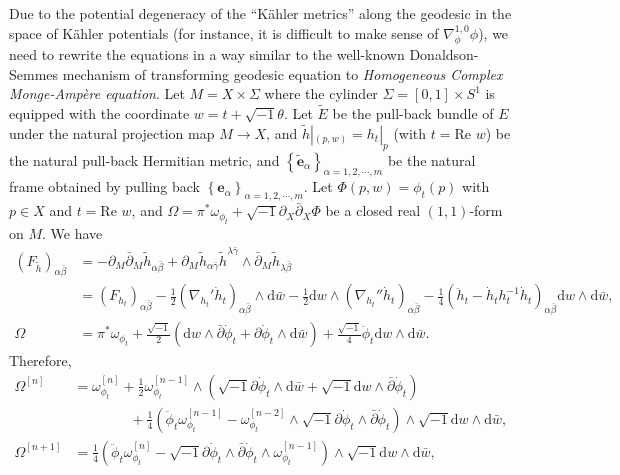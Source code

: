 \documentclass[10pt, letterpaper]{amsart}
\theoremstyle{plain}
\theoremstyle{definition}
\numberwithin{equation}{section}
\begin{document}
Due to the potential degeneracy of the ``K\"ahler metrics'' along the geodesic in the space of K\"ahler potentials (for instance, it is difficult to make sense of $\nabla_\phi^{1,0}\phi$), we need to rewrite the equations in a way similar to the well-known Donaldson-Semmes mechanism of transforming geodesic equation to \emph{Homogeneous Complex Monge-Amp\`ere equation}. Let $M= X\times \Sigma$ where the cylinder $\Sigma= [0,1]\times S^1$ is equipped with the coordinate $w=t+\sqrt{-1}\theta$. Let $\widetilde{E}$ be the pull-back bundle of $E$ under the natural projection map $M\to X$, and $\widetilde{h}|_{(p,w)}=h_t|_p$ (with $t=\text{Re }w$) be the natural pull-back Hermitian metric, and $\left\{\widetilde{\mathbf e}_\alpha\right\}_{\alpha=1,2,\cdots, m}$ be the natural frame obtained by pulling back $\left\{\mathbf{e}_\alpha\right\}_{\alpha=1,2,\cdots, m}$. Let $\Phi(p,w)=\phi_t\left(p\right)$ with $p\in X$ and $t=\text{Re }w$, and $\Omega = \pi^*\omega_{\phi_t} + \sqrt{-1}\partial_X\bar\partial_X \Phi$ be a closed real $(1,1)$-form on $M$. We have 
\begin{align*}
    \left( F_{\widetilde h} \right)_{\alpha\bar\beta}
    & = 
    -\partial_M \bar\partial_M \widetilde{h}_{\alpha\bar\beta}
    + 
    \partial_M \widetilde{h}_{\alpha\bar\gamma}\widetilde{h}^{\lambda\bar\gamma}\wedge\bar\partial_M \widetilde{h}_{\lambda\bar\beta}\\
    & = 
    \left(F_{h_t}\right)_{\alpha\bar\beta}
    - 
    \frac{1}{2}\left(\nabla_{h_t}' \dot h_t\right)_{\alpha\bar\beta}\wedge\mathrm{d}\bar w
    - 
    \frac{1}{2}\mathrm{d}w\wedge \left(\nabla_{h_t}''\dot h_t\right)_{\alpha\bar\beta}
    - 
    \frac{1}{4}\left(\ddot h_t- \dot h_t h_t^{-1}\dot h_t\right)_{\alpha\bar\beta}\mathrm{d}w\wedge\mathrm{d}\bar w, \\
    \Omega 
    & = 
    \pi^*\omega_{\phi_t}
    + 
    \frac{\sqrt{-1}}{2}\left(\mathrm{d}w\wedge \bar\partial\dot\phi_t + \partial \dot\phi_t\wedge \mathrm{d}\bar w\right) 
    + 
    \frac{\sqrt{-1}}{4}\ddot\phi_t \mathrm{d}w\wedge \mathrm{d}\bar w.
\end{align*}
Therefore, 
\begin{align*}
    \Omega^{[n]}
    & = 
    \omega_{\phi_t}^{[n]}
    + 
    \frac{1}{2}\omega_{\phi_t}^{[n-1]}\wedge \left(\sqrt{-1}\partial\dot\phi_t\wedge \mathrm{d}\bar w + \sqrt{-1}\mathrm{d}w\wedge \bar\partial \dot\phi_t\right)\\
    &\qquad \qquad
    + 
    \frac{1}{4}\left(\ddot\phi_t \omega_{\phi_t}^{[n-1]}  - \omega_{\phi_t}^{[n-2]}\wedge \sqrt{-1}\partial\dot\phi_t\wedge \bar\partial \dot\phi_t\right)\wedge \sqrt{-1}\mathrm{d}w\wedge \mathrm{d}\bar w,\\
    \Omega^{[n+1]}
    & = 
    \frac{1}{4}\left(\ddot\phi_t \omega_{\phi_t}^{[n]}
    - 
    \sqrt{-1}\partial\dot\phi_t\wedge \bar\partial \dot \phi_t\wedge\omega_{\phi_t}^{[n-1]}\right)\wedge \sqrt{-1}\mathrm{d}w\wedge\mathrm{d}\bar w,
\end{align*}
\end{document}
